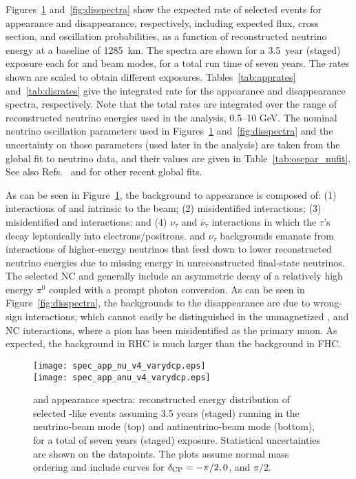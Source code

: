 Figures~\ref{fig:appspectra} and~\ref{fig:disspectra} show the expected rate of selected events for \nue appearance and \numu disappearance, respectively, including expected flux, cross section, and oscillation probabilities, as a function of reconstructed neutrino energy at a baseline of
\num{1285}~km. The spectra are shown for a \num{3.5}~year (staged) exposure each for  and  beam modes, for a total run time of seven %
years. The rates shown are scaled to obtain different exposures. Tables~\ref{tab:apprates} and~\ref{tab:disrates} give the integrated rate for the \nue %
appearance and \numu disappearance spectra, respectively. Note that the total rates are integrated over the range of reconstructed neutrino energies used in the analysis, 0.5--10 GeV. The nominal neutrino oscillation parameters used in Figures~\ref{fig:appspectra} and~\ref{fig:disspectra} and the uncertainty on those parameters (used later in the analysis) are taken from the ~\cite{Esteban:2018azc,nufitweb} global fit to neutrino data, and their values are given in Table~\ref{tab:oscpar_nufit}. See also
Refs.~\cite{deSalas:2017kay} and \cite{Capozzi:2017yic} for other recent global fits.

As can be seen in Figure~\ref{fig:appspectra}, the background to \nue appearance is composed of: (1)  interactions of \nue and \anue intrinsic to the beam; (2) misidentified  interactions;  (3) misidentified \numu and \anumu {} interactions; and (4) $\nu_\tau$ and $\bar{\nu}_\tau$  interactions in which the $\tau$'s decay leptonically into electrons/positrons.  and $\nu_\tau$ backgrounds emanate from interactions of higher-energy neutrinos that feed down to lower reconstructed neutrino energies due to missing energy in unreconstructed final-state neutrinos. The selected NC and  \numu generally include an asymmetric decay of a relatively high energy $\pi^0$ coupled with a prompt photon conversion. As can be seen in Figure~\ref{fig:disspectra}, the backgrounds to the \numu disappearance are due to wrong-sign \numu interactions, which cannot easily be distinguished in the unmagnetized  , and NC interactions, where a pion has been misidentified as the primary muon. As expected, the \numu background in RHC is much larger than the \anumu background in FHC.

\begin{figure}[htbp]
 \texttt{[image: spec\_app\_nu\_v4\_varydcp.eps]}\\
 \texttt{[image: spec\_app\_anu\_v4\_varydcp.eps]}
 \caption{\nue and \anue appearance spectra: reconstructed energy distribution of selected \nue {}-like events assuming 3.5 years (staged) running in the neutrino-beam mode (top) and antineutrino-beam mode (bottom), for a total of seven years (staged) exposure. Statistical uncertainties are shown on the datapoints. The plots assume normal mass ordering and include curves for $\delta_{\rm CP} = -\pi/2, 0$, and $\pi/2$.}
 \label{fig:appspectra}
\end{figure}

